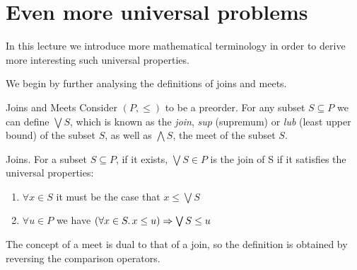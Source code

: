 \chapter{Even more universal problems}

In this lecture we introduce more mathematical terminology in order to 
derive more interesting such universal properties.

We begin by further analysing the definitions of joins and meets.

\begin{section}{Joins and Meets}
Consider $(P, \leq)$ to be a preorder. For any subset $S \subseteq P$ we can define 
$\bigvee S$, which is known as the \emph{join}, \emph{sup} (supremum) or \emph{lub} 
(least upper bound) of the subset $S$, as well as $\bigwedge S$, the meet of the subset $S$.
\begin{definition}\label{defjoins}{Joins.} 
    For a subset $S \subseteq P$, if it exists, $\bigvee S \in P$ is the join of S if
    it satisfies the universal properties:
        \begin{enumerate}
            \item $\forall x \in S$ it must be the case that $x \leq \bigvee S$ 
            \item $\forall u \in P$ we have $(\forall x \in S \ldotp x \leq u) \Rightarrow \bigvee S \leq u$
        \end{enumerate}
\end{definition}

The concept of a meet is dual to that of a join, so the definition is obtained
by reversing the comparison operators.


\end{section}
